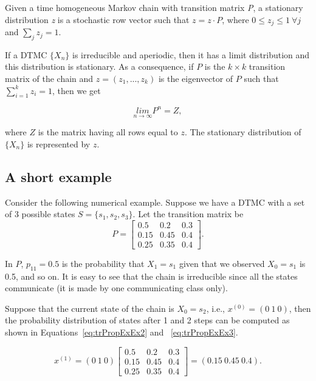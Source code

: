 \documentclass[nojss]{jss}
\begin{document}
Given a time homogeneous Markov chain with transition matrix \emph{P},
a stationary distribution \emph{z} is a stochastic row vector such that $z=z\cdot P$, where $0\leq z_{j}\leq 1 \: \forall j$ and
$\sum_{j}z_{j}=1$.

If a DTMC $\{X_{n}\}$ is irreducible and aperiodic, then it has a limit distribution and this distribution is stationary. As a consequence, if $P$
is the $k\times k$ transition matrix of the chain and $z=\left(z_{1},...,z_{k}\right)$ is the eigenvector of $P$ such that $\sum_{i=1}^{k}z_{i}=1$, then we get

\begin{equation}
  \underset{n\rightarrow\infty}{lim}P^{n}=Z,
  \label{eq:limMc}
\end{equation}


where $Z$ is the matrix having all rows equal to $z$. The stationary distribution of $\{X_{n}\}$ is represented by $z$.


\subsection{A short example}

Consider the following numerical example. Suppose we have a DTMC with a set of 3 possible states $S=\{s_{1}, s_{2}, s_{3}\}$.
Let the transition matrix be 
\begin{equation}
P=\left[\begin{array}{ccc}
0.5 & 0.2 & 0.3\\
0.15 & 0.45 & 0.4\\
0.25 & 0.35 & 0.4
\end{array}\right].
\label{eq:trPropExEx1}
\end{equation}

In $P$, $p_{11}=0.5$ is the probability that $X_{1}=s_{1}$ given
that we observed $X_{0}=s_{1}$ is 0.5, and so on. 
It is easy to see that the chain is irreducible since all the states communicate (it is made by one communicating class only).

Suppose that the current state of the chain is $X_{0}=s_{2}$, i.e., $x^{(0)}=(0\:1\:0)$, then the probability distribution of states after 1 and 2 steps can be computed as shown in Equations~\ref{eq:trPropExEx2} and
~\ref{eq:trPropExEx3}.

\begin{equation}
x^{(1)}=\left(0\:1\:0\right)\left[\begin{array}{ccc}
0.5 & 0.2 & 0.3\\
0.15 & 0.45 & 0.4\\
0.25 & 0.35 & 0.4
\end{array}\right]=\left(0.15\:0.45\:0.4\right).
\label{eq:trPropExEx2}
\end{equation}
\end{document}
